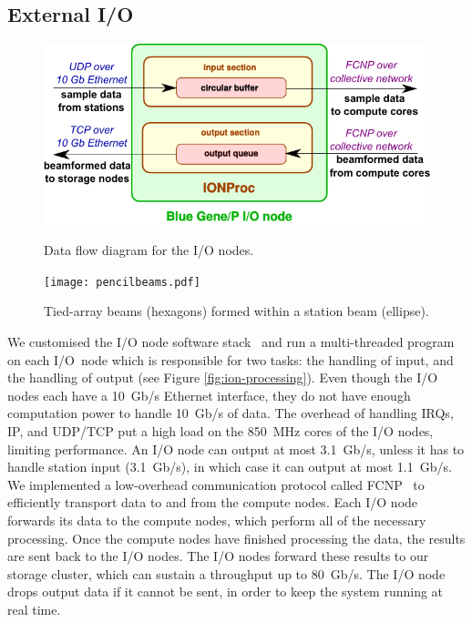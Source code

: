 \documentclass{llncs}
\begin{document}
\subsection{External I/O}
\label{Sec:Networks}

\begin{figure}[ht]
\begin{minipage}[t]{0.47\textwidth}
\includegraphics[width=\textwidth]{ION-processing.pdf}
\caption{Data flow diagram for the I/O nodes.}
\label{fig:ion-processing}
\end{minipage}
\hfill
\begin{minipage}[t]{0.3\textwidth}
\center
\texttt{[image: pencilbeams.pdf]}
\caption{Tied-array beams (hexagons) formed within a station beam (ellipse).}
\label{fig:pencilbeams}
\end{minipage}
\end{figure}

We customised the I/O node software stack~\cite{Yoshii:10} and run a multi-threaded program on each I/O~node which is responsible for two tasks: the handling of input, and the handling of output (see Figure \ref{fig:ion-processing}). Even though the I/O nodes each have a 10~Gb/s Ethernet interface, they do not have enough computation power to handle 10~Gb/s of data. The overhead of handling IRQs, IP, and UDP/TCP put a high load on the 850~MHz cores of the I/O nodes, limiting performance. An I/O node can output at most 3.1~Gb/s, unless it has to handle station input (3.1~Gb/s), in which case it can output at most 1.1~Gb/s. We implemented a low-overhead communication protocol called FCNP~\cite{Romein:09a} to efficiently transport data to and from the compute nodes. Each I/O node forwards its data to the compute nodes, which perform all of the necessary processing. Once the compute nodes have finished processing the data, the results are sent back to the I/O nodes. The I/O nodes forward these results to our storage cluster, which can sustain a throughput up to 80~Gb/s. The I/O node drops output data if it cannot be sent, in order to keep the system running at real time.
\end{document}
